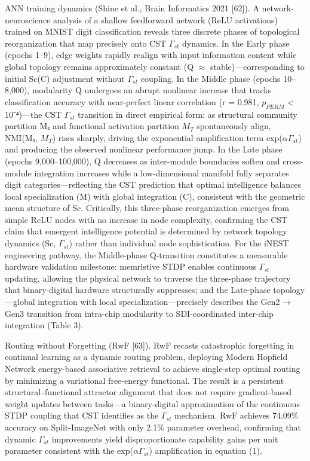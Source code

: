 \documentclass[a4paper,12pt]{article}
\begin{document}
ANN training dynamics (Shine et al., Brain Informatics 2021 [62]).
A network-neuroscience analysis of a shallow feedforward network (ReLU activations) trained on MNIST digit classification reveals three discrete phases of topological reorganization that map precisely onto CST $\Gamma_{st}$ dynamics.
In the Early phase (epochs 1--9), edge weights rapidly realign with input information content while global topology remains approximately constant (Q $\approx$ stable)---corresponding to initial Sc(C) adjustment without $\Gamma_{st}$ coupling.
In the Middle phase (epochs 10--8,000), modularity Q undergoes an abrupt nonlinear increase that tracks classification accuracy with near-perfect linear correlation (r = 0.981, $p_{PERM}$ < 10⁻⁴)---the CST $\Gamma_{st}$ transition in direct empirical form: as structural community partition Mₛ and functional activation partition $M_{T}$ spontaneously align, NMI(Mₛ, $M_{T}$) rises sharply, driving
the exponential amplification term exp($\alpha$\cdot$\Gamma_{st}$) and producing the observed nonlinear performance jump.
In the Late phase (epochs 9,000--100,000), Q decreases as inter-module boundaries soften and cross-module integration increases while a low-dimensional manifold fully separates digit categories---reflecting the CST prediction that optimal intelligence balances local specialization (M) with global integration (C), consistent with the geometric mean structure of Sc.
Critically, this three-phase reorganization emerges from simple ReLU nodes with no increase in node complexity, confirming the CST claim that emergent intelligence potential is determined by network topology dynamics (Sc, $\Gamma_{st}$) rather than individual node sophistication.
For the iNEST engineering pathway, the Middle-phase Q-transition constitutes a measurable hardware validation milestone: memristive STDP enables continuous $\Gamma_{st}$ updating, allowing the physical network to traverse the three-phase trajectory that binary-digital hardware structurally suppresses; and the Late-phase topology---global integration with local specialization---precisely describes
the Gen2$\rightarrow$Gen3 transition from intra-chip modularity to SDI-coordinated inter-chip integration (Table 3).


Routing without Forgetting (RwF [63]).
RwF recasts catastrophic forgetting in continual learning as a dynamic routing problem, deploying Modern Hopfield Network energy-based associative retrieval to achieve single-step optimal routing by minimizing a variational free-energy functional.
The result is a persistent structural--functional attractor alignment that does not require gradient-based weight updates between tasks---a binary-digital approximation of the continuous STDP coupling that CST identifies as the $\Gamma_{st}$ mechanism.
RwF achieves 74.09\% accuracy on Split-ImageNet with only 2.1\% parameter overhead, confirming that dynamic $\Gamma_{st}$ improvements yield disproportionate capability gains per unit parameter consistent with the exp($\alpha$\cdot$\Gamma_{st}$) amplification in equation (1).
\end{document}
